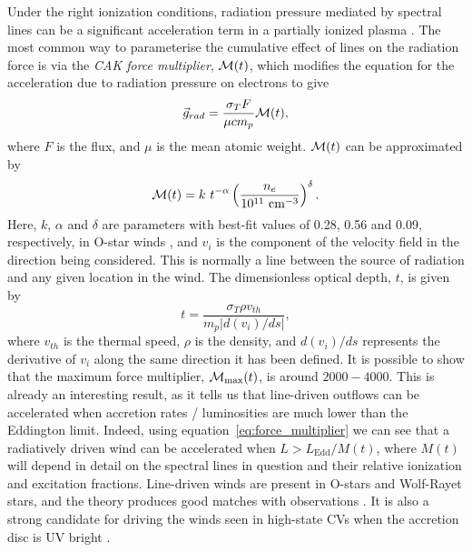 Under the right ionization conditions, radiation pressure mediated by spectral lines
can be a significant  acceleration term in 
a partially ionized plasma \citep[][hereafter CAK]{CAK75}. 
The most common way to parameterise the cumulative
effect of lines on the radiation force is via the 
{\em CAK force multiplier}, ${\cal M}(t)$,
which modifies the equation for the acceleration due to radiation pressure on electrons
to give \citep[][CAK]{castor1974}
\begin{equation}
\label{eq:force_multiplier}
\vec{g}_{rad} = \frac{\sigma_T F}{\mu c m_p} {\cal M}(t),
\end{equation}
where $F$ is the flux, and $\mu$ is the mean atomic weight.
${\cal M}(t)$ can be approximated by \citep{abbott1982}
\begin{equation}
\label{eq:force_multiplier2}
{\cal M}(t) = k~t^{-\alpha} 
\left( \frac{n_e}{10^{11}~{\rm cm}^{-3}}\right)^\delta.
\end{equation}
Here, $k$, $\alpha$ and $\delta$ are parameters
with best-fit values of 0.28, 0.56 and 0.09, respectively, in O-star winds \citep{abbott1982},
and $v_i$ is the component of the velocity field in the direction
being considered. This is normally a line between the source of radiation and any
given location in the wind.
The dimensionless optical depth, $t$, is given by
\begin{equation}
t = \frac{\sigma_T \rho v_{th}}{m_p | d(v_i) / ds |},
\end{equation}
where $v_{th}$ is the thermal speed, $\rho$ is the density, and $d(v_i) / ds$ represents
the derivative of $v_i$ along the same direction it has been defined.
It is possible to show \citep[CAK, ][]{owocki1988} that the maximum force multiplier,
${\cal M}_{\mathrm{max}}(t)$,
is around $2000-4000$. This is already an interesting result, as it tells us
that line-driven outflows can be accelerated when accretion rates / luminosities
are much lower than the Eddington limit. Indeed, using 
equation~\ref{eq:force_multiplier} we can see that a radiatively driven wind 
can be accelerated when $L > L_{\mathrm{Edd}} / M(t)$, where $M(t)$ will depend in detail on
the spectral lines in question and their relative ionization and excitation fractions.
Line-driven winds are present in O-stars and Wolf-Rayet stars, and the theory
produces good matches with observations 
\citep[e.g.][]{friend1986,pauldrach1986,pauldrach1994,hamann2008}. 
It is also a strong candidate for driving
the winds seen in high-state CVs when the accretion disc is UV bright 
\citep[][see also section~\ref{sec:proga}]{pereyra1997,proga1998,proga2005}.

